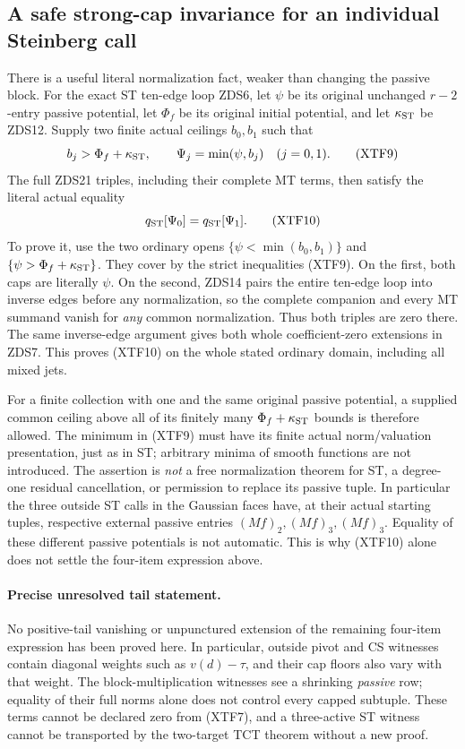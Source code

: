 \subsection{A safe strong-cap invariance for an individual Steinberg call}

There is a useful literal normalization fact, weaker than changing
the passive block.  For the exact ST ten-edge loop ZDS6, let
$\psi$ be its original unchanged $r-2$-entry passive potential,
let $\Phi_f$ be its original initial potential, and let
$\kappa_{\rm ST}$ be ZDS12.  Supply two finite actual ceilings
$b_0,b_1$ such that
\[
       b_j>\Phi_f+\kappa_{\rm ST},\qquad
                  \Psi_j=\min(\psi,b_j)\quad(j=0,1).
 \tag{XTF9}
\]
The full ZDS21 triples, including their complete MT terms, then
satisfy the literal actual equality
\[
                       q_{\rm ST}[\Psi_0]=q_{\rm ST}[\Psi_1].
 \tag{XTF10}
\]
To prove it, use the two ordinary opens
$\{\psi<\min(b_0,b_1)\}$ and
$\{\psi>\Phi_f+\kappa_{\rm ST}\}$.
They cover by the strict inequalities (XTF9).  On the first,
both caps are literally $\psi$.  On the second, ZDS14 pairs the
entire ten-edge loop into inverse edges before any normalization,
so the complete companion and every MT summand vanish for
\emph{any} common normalization.  Thus both triples are zero
there.  The same inverse-edge argument gives both whole
coefficient-zero extensions in ZDS7.  This proves (XTF10) on
the whole stated ordinary domain, including all mixed jets.

For a finite collection with one and the same original passive
potential, a supplied common ceiling above all of its finitely
many $\Phi_f+\kappa_{\rm ST}$ bounds is therefore allowed.
The minimum in (XTF9) must have its finite actual norm/valuation
presentation, just as in ST; arbitrary minima of smooth functions
are not introduced.  The assertion is \emph{not} a free
normalization theorem for ST, a degree-one residual cancellation,
or permission to replace its passive tuple.  In particular the
three outside ST calls in the Gaussian faces have, at their actual
starting tuples, respective external passive entries
$(Mf)_2,(Mf)_3,(Mf)_3$.  Equality of these different passive
potentials is not automatic.  This is why (XTF10) alone does not
settle the four-item expression above.

\paragraph{Precise unresolved tail statement.}
No positive-tail vanishing or unpunctured extension of the
remaining four-item expression has been proved here.  In particular,
outside pivot and CS witnesses contain diagonal weights such as
$v(d)-\tau$, and their cap floors also vary with that weight.
The block-multiplication witnesses see a shrinking \emph{passive}
row; equality of their full norms alone does not control every
capped subtuple.  These terms cannot be declared zero from
(XTF7), and a three-active ST witness cannot be transported by
the two-target TCT theorem without a new proof.

